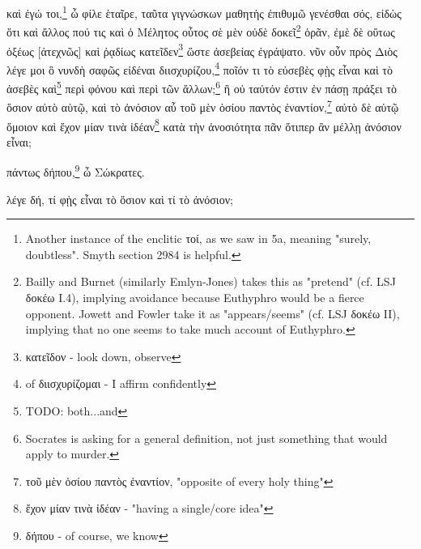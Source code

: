 καὶ
ἐγώ
τοι,\footnote{Αnother instance of the enclitic τοί, as we saw in 5a, meaning "surely, doubtless". Smyth section 2984 is helpful.}
ὦ
φίλε
ἑταῖρε,
ταῦτα
γιγνώσκων
μαθητὴς
ἐπιθυμῶ
γενέσθαι
σός,
εἰδὼς
ὅτι
καὶ
ἄλλος
πού
τις
καὶ
ὁ
Μέλητος
οὗτος
σὲ
μὲν
οὐδὲ
δοκεῖ\footnote{Bailly and Burnet (similarly Emlyn-Jones) takes this as "pretend" (cf. LSJ δοκέω I.4), implying avoidance because Euthyphro would be a fierce opponent. Jowett and Fowler take it as "appears/seems" (cf. LSJ δοκέω II), implying that no one seems to take much account of Euthyphro.}
ὁρᾶν,
ἐμὲ
δὲ
οὕτως
ὀξέως
[ἀτεχνῶς]
καὶ
ῥᾳδίως
κατεῖδεν\footnote{κατεῖδον - look down, observe}
ὥστε
ἀσεβείας
ἐγράψατο.
νῦν
οὖν
πρὸς
Διὸς
λέγε
μοι
ὃ
νυνδὴ
σαφῶς
εἰδέναι
διισχυρίζου,\footnote{ of διισχυρίζομαι - I affirm confidently}
ποῖόν
τι
τὸ
εὐσεβὲς
φῂς
εἶναι
καὶ
τὸ
ἀσεβὲς
\versification{[5d]}
καὶ\footnote{TODO: both...and}
περὶ
φόνου
καὶ
περὶ
τῶν
ἄλλων;\footnote{Socrates is asking for a general definition, not just something that would apply to murder.}
ἢ
οὐ
ταὐτόν
ἐστιν
ἐν
πάσῃ
πράξει
τὸ
ὅσιον
αὐτὸ
αὑτῷ,
καὶ
τὸ
ἀνόσιον
αὖ
τοῦ
μὲν
ὁσίου
παντὸς
ἐναντίον,\footnote{τοῦ μὲν ὁσίου παντὸς ἐναντίον, "opposite of every holy thing"}
αὐτὸ
δὲ
αὑτῷ
ὅμοιον
καὶ
ἔχον
μίαν
τινὰ
ἰδέαν\footnote{ἔχον μίαν τινὰ ἰδέαν - "having a single/core idea"}
κατὰ
τὴν
ἀνοσιότητα
πᾶν
ὅτιπερ
ἂν
μέλλῃ
ἀνόσιον
εἶναι;

πάντως
δήπου,\footnote{δήπου - of course, we know}
ὦ
Σώκρατες.

λέγε
δή,
τί
φῂς
εἶναι
τὸ
ὅσιον
καὶ
τί
τὸ
ἀνόσιον;

